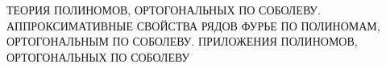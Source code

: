  \begin{center}
 {\large


 ТЕОРИЯ ПОЛИНОМОВ, ОРТОГОНАЛЬНЫХ ПО СОБОЛЕВУ. \\[4pt]
 АППРОКСИМАТИВНЫЕ СВОЙСТВА РЯДОВ ФУРЬЕ ПО ПОЛИНОМАМ, \\[4pt]
 ОРТОГОНАЛЬНЫМ ПО СОБОЛЕВУ. ПРИЛОЖЕНИЯ ПОЛИНОМОВ, \\[4pt]
 ОРТОГОНАЛЬНЫХ ПО СОБОЛЕВУ
 }
 \\[12pt]
\end{center}
